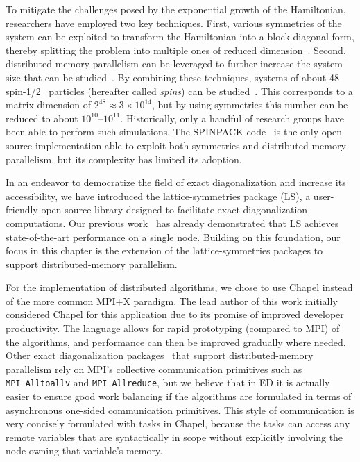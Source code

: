 To mitigate the challenges posed by the exponential growth of the Hamiltonian, researchers have employed two key techniques. First, various symmetries of the system can be exploited to transform the Hamiltonian into a block-diagonal form, thereby splitting the problem into multiple ones of reduced dimension~\cite{Sandvi2010ComputationalS}. Second, distributed-memory parallelism can be leveraged to further increase the system size that can be studied~\cite{Kawamura2017quant,Amaricci2022edipa,Iskako2018ExactDiagonali}. By combining these techniques, systems of about 48 spin-1/2~\cite{Griffi2018IntroductionTo} particles (hereafter called \emph{spins}) can be studied~\cite{Wietek2018subla,Lauchl2019Kagome}. This corresponds to a matrix dimension of $2^{48} \approx 3 \times 10^{14}$, but by using symmetries this number can be reduced to about $10^{10}$--$10^{11}$. Historically, only a handful of research groups have been able to perform such simulations. The SPINPACK code~\cite{Schule2017Spinpack} is the only open source implementation able to exploit both symmetries and distributed-memory parallelism, but its complexity has limited its adoption.

In an endeavor to democratize the field of exact diagonalization and increase its accessibility, we have introduced the lattice-symmetries package (LS), a user-friendly open-source library designed to facilitate exact diagonalization computations. Our previous work~\cite{Westerhout2021latti} has already demonstrated that LS achieves state-of-the-art performance on a single node. Building on this foundation, our focus in this chapter is the extension of the lattice-symmetries packages to support distributed-memory parallelism.

For the implementation of distributed algorithms, we chose to use Chapel instead of the more common MPI+X paradigm. The lead author of this work initially considered Chapel for this application due to its promise of improved developer productivity. The language allows for rapid prototyping (compared to MPI) of the algorithms, and performance can then be improved gradually where needed. Other exact diagonalization packages~\cite{Wietek2018subla,Kawamura2017quant,Schule2017Spinpack} that support distributed-memory parallelism rely on MPI's collective communication primitives such as \verb|MPI_Alltoallv| and \verb|MPI_Allreduce|, but we believe that in ED it is actually easier to ensure good work balancing if the algorithms are formulated in terms of asynchronous one-sided communication primitives. This style of communication is very concisely formulated with tasks in Chapel, because the tasks can access any remote variables that are syntactically in scope without explicitly involving the node owning that variable's memory.

